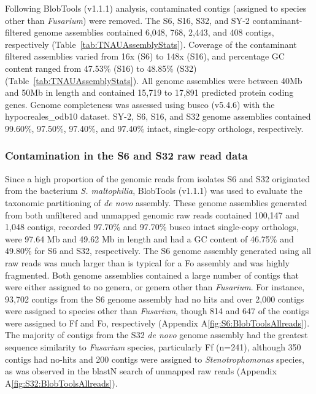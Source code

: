 Following BlobTools (v1.1.1) analysis, contaminated contigs (assigned to species other than \textit{Fusarium}) were removed. The  S6, S16, S32, and SY-2 contaminant-filtered genome assemblies contained 6,048, 768, 2,443, and 408 contigs, respectively (Table~\ref{tab:TNAUAssemblyStats}). Coverage of the contaminant filtered assemblies varied from 16x (S6) to 148x (S16), and percentage GC content ranged from 47.53\% (S16) to 48.85\% (S32) (Table~\ref{tab:TNAUAssemblyStats}). All genome assemblies were between 40Mb and 50Mb in length and contained 15,719 to 17,891 predicted protein coding genes. Genome completeness was assessed using \ac{busco} (v5.4.6) with the hypocreales\_odb10 dataset. SY-2, S6, S16, and S32 genome assemblies contained 99.60\%, 97.50\%, 97.40\%, and 97.40\% intact, single-copy orthologs, respectively. 



\subsubsection{Contamination in the S6 and S32 raw read data}
\label{sec:BlobToolsOfS6S32-allreads}

Since a high proportion of the genomic reads from isolates S6 and S32 originated from the bacterium \textit{S. maltophilia}, BlobTools (v1.1.1) was used to evaluate the taxonomic partitioning of \textit{de novo} assembly. These genome assemblies generated from both unfiltered and unmapped genomic raw reads contained 100,147 and 1,048 contigs, recorded  97.70\% and 97.70\% \ac{busco} intact single-copy orthologs, were 97.64 Mb and 49.62 Mb in length and had a GC content of 46.75\% and 49.80\% for S6 and S32, respectively. The S6 genome assembly generated using all raw reads was much larger than is typical for a \ac{Fo} assembly and was highly fragmented. Both genome assemblies contained a large number of contigs that were either assigned to no genera, or genera other than \textit{Fusarium}. For instance, 93,702 contigs from the S6 genome assembly had no hits and over 2,000 contigs were assigned to species other than \textit{Fusarium}, though 814 and 647 of the contigs were assigned to \ac{Ff} and \ac{Fo}, respectively (Appendix A\ref{fig:S6:BlobToolsAllreads}). The majority of contigs from the S32 \textit{de novo} genome assembly had the greatest sequence similarity to \textit{Fusarium} species, particularly \ac{Ff} (n=241), although 350 contigs had no-hits and 200 contigs were assigned to \textit{Stenotrophomonas} species, as was observed in the \acs{blast}N search of unmapped raw reads (Appendix A\ref{fig:S32:BlobToolsAllreads}). 

